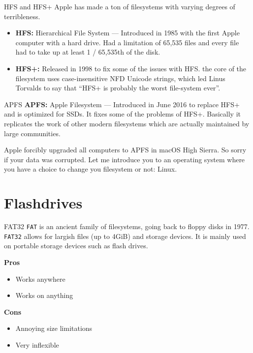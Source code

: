 \documentclass{lug}
\begin{document}
\begin{frame}{HFS and HFS+}
    Apple has made a ton of filesystems with varying degrees of terribleness.
    \begin{itemize}
        \item \textbf{HFS:} Hierarchical File System --- Introduced in 1985 with
            the first Apple computer with a hard drive. Had a limitation of
            65,535 files and every file had to take up at least 1 / 65,535th of
            the disk.

        \item \textbf{HFS+:} Released in 1998 to fix some of the issues with
            HFS. the core of the filesystem uses case-insensitive NFD Unicode
            strings, which led Linus Torvalds to say that ``HFS+ is probably the
            worst file-system ever''.
    \end{itemize}
\end{frame}

\begin{frame}{APFS}
    \textbf{APFS:} Apple Filesystem --- Introduced in June 2016 to replace HFS+
    and is optimized for SSDs. It fixes some of the problems of HFS+. Basically
    it replicates the work of other modern filesystems which are actually
    maintained by large communities.

    Apple forcibly upgraded all computers to APFS in macOS High Sierra. So sorry
    if your data was corrupted. Let me introduce you to an operating system
    where you have a choice to change you filesystem or not: Linux.
\end{frame}

\section{Flashdrives}
\begin{frame}{FAT32}
    \texttt{FAT} is an ancient family of filesystems, going back to floppy disks
    in 1977. \texttt{FAT32} allows for largish files (up to 4GiB) and storage
    devices. It is mainly used on portable storage devices such as flash drives.

    \textbf{Pros}
    \begin{itemize}
        \item Works anywhere
        \item Works on anything
    \end{itemize}

    \textbf{Cons}
    \begin{itemize}
        \item Annoying size limitations
        \item Very inflexible
    \end{itemize}
\end{frame}
\end{document}

